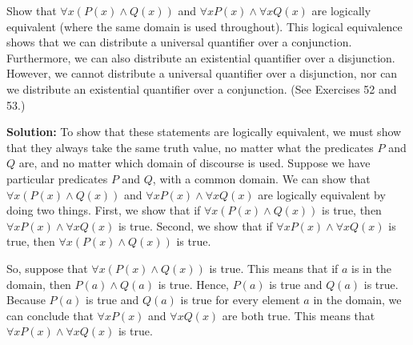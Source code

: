 \documentclass{Axon}
\begin{document}
\begin{example}\label{Example: 19}
    Show that \(\forall x (P(x) \land Q(x))\) and \(\forall x P(x) \land \forall x Q(x)\) are logically equivalent (where the same domain is used throughout). This logical equivalence shows that we can distribute a universal quantifier over a conjunction. Furthermore, we can also distribute an existential quantifier over a disjunction. However, we cannot distribute a universal quantifier over a disjunction, nor can we distribute an existential quantifier over a conjunction. (See Exercises 52 and 53.)

    \noindent
    \textbf{Solution:}
    To show that these statements are logically equivalent, we must show that they always take the same truth value, no matter what the predicates \(P\) and \(Q\) are, and no matter which domain of discourse is used. Suppose we have particular predicates \(P\) and \(Q\), with a common domain. We can show that \(\forall x (P(x) \land Q(x))\) and \(\forall x P(x) \land \forall x Q(x)\) are logically equivalent by doing two things. First, we show that if \(\forall x (P(x) \land Q(x))\) is true, then \(\forall x P(x) \land \forall x Q(x)\) is true. Second, we show that if \(\forall x P(x) \land \forall x Q(x)\) is true, then \(\forall x (P(x) \land Q(x))\) is true.

    So, suppose that \(\forall x (P(x) \land Q(x))\) is true. This means that if \(a\) is in the domain, then \(P(a) \land Q(a)\) is true. Hence, \(P(a)\) is true and \(Q(a)\) is true. Because \(P(a)\) is true and \(Q(a)\) is true for every element \(a\) in the domain, we can conclude that \(\forall x P(x)\) and \(\forall x Q(x)\) are both true. This means that \(\forall x P(x) \land \forall x Q(x)\) is true.
\end{example}

\printbibliography
\end{document}
